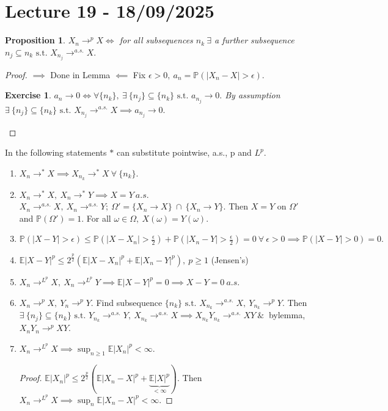 \documentclass{article}
\newcommand{\1}{\mathds{1}}
\newcommand{\E}{\mathbb{E}}
\newcommand{\PB}{\mathbb{P}}
\newcommand{\lf}{\left}
\newcommand{\rg}{\right}
\newcommand{\f}[2]{\frac{#1}{#2}}
\newcommand{\st}{\text{ s.t. }}
\newcommand{\card}[1]{\lf\vert #1\rg\vert}
\newcommand{\ar}{\ \&\ }
\newtheorem{proposition}[theorem]{Proposition}
\newtheorem{exercise}{Exercise}
\begin{document}
\section{Lecture 19 - 18/09/2025}
\begin{proposition}
    $X_n\to^p X\iff$ for all subsequences $n_k\ \exists$ a further subsequence $n_j\subseteq n_k\st X_{n_j}\to^{a.s.} X.$ 
\end{proposition}
\begin{proof}
    $\implies$ Done in Lemma
    \noindent $\impliedby$ Fix $\epsilon>0,\ a_n=\PB(\card{X_n-X}>\epsilon).$
    \begin{exercise}
        $a_n\to 0\iff \forall \{n_k\},\ \exists\ \{n_j\}\subseteq\{n_k\}\st a_{n_j}\to 0.$ By assumption $\exists\ \{n_j\}\subseteq\{n_k\}\st X_{n_j}\to^{a.s.} X\implies a_{n_j}\to 0.$ 
    \end{exercise}
\end{proof}
In the following statements $*$ can substitute pointwise, a.s., p and $L^p.$
\begin{enumerate}
    \item $X_n\to^* X\implies X_{n_k}\to^* X\ \forall\ \{n_k\}.$
    \item $X_n\to^* X,\ X_n\to^* Y\implies X=Y\ a.s.$
     $X_n\to^{a.s.} X,\ X_n\to^{a.s.} Y;\ \Omega'=\{X_n\to X\}\ \cap\ \{X_n\to Y\}.$ Then $X=Y$ on $\Omega'$ and $\PB(\Omega')=1.$ For all $\omega\in\Omega,\ X(\omega)=Y(\omega).$
     \item $\PB(\card{X-Y}>\epsilon)\leq \PB\lf(\card{X-X_n}>\f\epsilon 2\rg)+\PB\lf(\card{X_n-Y}>\f\epsilon2\rg)=0\ \forall\ \epsilon>0\implies\PB(\card{X-Y}>0)=0.$
     \item $\E\card{X-Y}^p\leq 2^{\f p2}(\E\card{X-X_n}^p+\E\card{X_n-Y}^p),\ p\geq 1$ (Jensen's)
     \item $X_n\to^{L^p} X,\ X_n\to^{L^p} Y\implies \E\card{X-Y}^p=0\implies X-Y=0\ a.s.$
     \item $X_n\to^p X,\ Y_n\to^p Y.$ Find subsequence $\{n_k\}\st X_{n_k}\to^{a.s.}X,\ Y_{n_k}\to^p Y$. Then $\exists\ \{n_j\}\subseteq\{n_k\}\st Y_{n_k}\to^{a.s.} Y,\ X_{n_k}\to^{a.s.} X\implies X_{n_k}Y_{n_k}\to^{a.s.} XY\ar$ bylemma, $X_nY_n\to^p XY.$
     \item $X_n\to^{L^p} X\implies \sup_{n\geq 1}\E\card{X_n}^p <\infty.$
     \begin{proof}
         $\E\card{X_n}^p\leq2^{\f p2}(\E\card{X_n-X}^p+\underbrace{\E\card{X}^p}_{<\infty}).$ Then $X_n\to^{L^p} X\implies\sup_n\E\card{X_n-X}^p<\infty. $
     \end{proof}
\end{enumerate}
\end{document}
